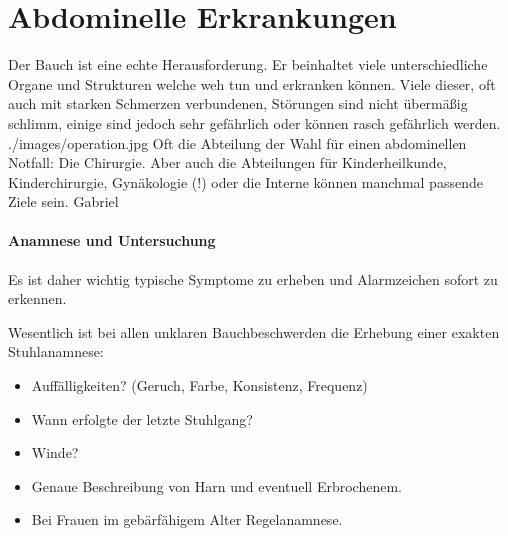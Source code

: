 \paragraph{} 







\clearpage

\section{Abdominelle Erkrankungen}



{
Der Bauch ist eine echte Herausforderung. Er
beinhaltet viele unterschiedliche Organe und Strukturen
welche weh tun und
erkranken können. Viele dieser, oft auch mit starken Schmerzen verbundenen, Störungen
sind nicht übermäßig schlimm, einige sind jedoch sehr gefährlich oder können rasch
gefährlich werden. 
}
{}
{./images/operation.jpg}
{\AuthNotesPicLegalOk{}{}Oft die
    Abteilung der Wahl für einen abdominellen Notfall: Die
    Chirurgie. Aber auch die Abteilungen für
    Kinderheilkunde, Kinderchirurgie, Gynäkologie (!) oder
    die Interne können manchmal passende Ziele sein.
    }{Gabriel}


\paragraph{Anamnese und Untersuchung} Es ist daher wichtig
typische Symptome zu erheben und Alarmzeichen sofort zu erkennen.

Wesentlich ist bei allen unklaren Bauchbeschwerden die Erhebung einer exakten Stuhlanamnese:

\begin{itemize}
  \item Auffälligkeiten? (Geruch, Farbe, Konsistenz, Frequenz)
  \item Wann erfolgte der letzte Stuhlgang?
  \item Winde?
  \item Genaue Beschreibung von Harn und eventuell Erbrochenem.
  \item Bei Frauen im gebärfähigem Alter Regelanamnese.
\end{itemize}

